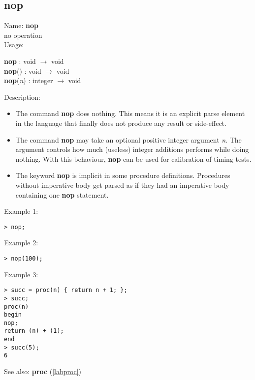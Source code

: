 \subsection{nop}
\label{labnop}
\noindent Name: \textbf{nop}\\
no operation\\
\noindent Usage: 
\begin{center}
\textbf{nop} : \textsf{void} $\rightarrow$ \textsf{void}
\\ 
\textbf{nop}() : \textsf{void} $\rightarrow$ \textsf{void}
\\ 
\textbf{nop}(\emph{n}) : \textsf{integer} $\rightarrow$ \textsf{void}
\\ 
\end{center}
\noindent Description: \begin{itemize}

\item The command \textbf{nop} does nothing. This means it is an explicit parse
   element in the \sollya language that finally does not produce any
   result or side-effect.

\item The command \textbf{nop} may take an optional positive integer argument \emph{n}. The argument controls how much (useless) integer additions \sollya performs while doing nothing. 
   With this behaviour, \textbf{nop} can be used for calibration of timing tests.

\item The keyword \textbf{nop} is implicit in some procedure
   definitions. Procedures without imperative body get parsed as if they
   had an imperative body containing one \textbf{nop} statement.
\end{itemize}
\noindent Example 1: 
\begin{center}\begin{minipage}{15cm}\begin{Verbatim}[frame=single]
> nop;
\end{Verbatim}
\end{minipage}\end{center}
\noindent Example 2: 
\begin{center}\begin{minipage}{15cm}\begin{Verbatim}[frame=single]
> nop(100);
\end{Verbatim}
\end{minipage}\end{center}
\noindent Example 3: 
\begin{center}\begin{minipage}{15cm}\begin{Verbatim}[frame=single]
> succ = proc(n) { return n + 1; };
> succ;
proc(n)
begin
nop;
return (n) + (1);
end
> succ(5);
6
\end{Verbatim}
\end{minipage}\end{center}
See also: \textbf{proc} (\ref{labproc})
